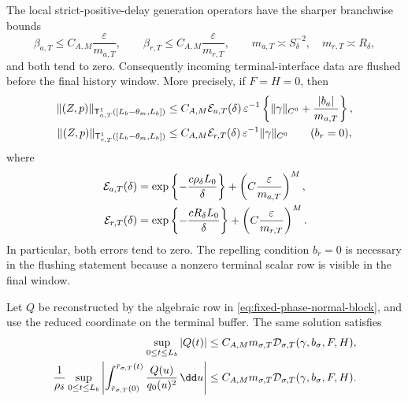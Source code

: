 \begin{proposition}
The local strict-positive-delay generation operators have the sharper
branchwise bounds
\begin{equation}
 \beta_{a,T}\le C_{A,M}\frac{\varepsilon}{m_{a,T}},
 \qquad
 \beta_{r,T}\le C_{A,M}\frac{\varepsilon}{m_{r,T}},
 \qquad
 m_{a,T}\asymp S_\delta^{-2},\quad
 m_{r,T}\asymp R_\delta,                         \label{eq:terminal-component-generation-numbers}
\end{equation}
and both tend to zero.  Consequently incoming terminal-interface data are
flushed before the final history window.  More precisely, if \(F=H=0\), then
\begin{align}
 \|(Z,p)\|_{\mathsf T_{a,T}^1([L_b-\theta_m,L_b])}
 &\le C_{A,M}\mathcal E_{a,T}(\delta)\,
   \varepsilon^{-1}\left\{
      \|\gamma\|_{C^0}+\frac{|b_a|}{m_{a,T}}\right\},\notag\\
 \|(Z,p)\|_{\mathsf T_{r,T}^1([L_b-\theta_m,L_b])}
 &\le C_{A,M}\mathcal E_{r,T}(\delta)\,
        \varepsilon^{-1}\|\gamma\|_{C^0}
        \qquad (b_r=0),                          \label{eq:terminal-component-rough-flush}
\end{align}
where
\begin{align}
 \mathcal E_{a,T}(\delta)
 &=\exp\left\{-\frac{c\rho_\delta L_0}{\delta}\right\}
       +\left(C\frac{\varepsilon}{m_{a,T}}\right)^M,\notag\\
 \mathcal E_{r,T}(\delta)
 &=\exp\left\{-\frac{cR_\delta L_0}{\delta}\right\}
       +\left(C\frac{\varepsilon}{m_{r,T}}\right)^M.
                                                        \label{eq:terminal-component-flush-errors}
\end{align}
In particular, both errors tend to zero.  The repelling condition \(b_r=0\)
is necessary in the flushing statement because a nonzero terminal scalar
row is visible in the final window.

Let \(Q\) be reconstructed by the algebraic row in
\cref{eq:fixed-phase-normal-block}, and use the reduced coordinate on the
terminal buffer.  The same solution satisfies
\begin{align}
 \sup_{0\le t\le L_b}|Q(t)|
 &\le C_{A,M}m_{\sigma,T}
       \mathcal D_{\sigma,T}(\gamma,b_\sigma,F,H),\notag\\
 \frac1{\rho_\delta}\sup_{0\le t\le L_b}
 \left|\int_{\bar r_{\sigma,T}(0)}^{\bar r_{\sigma,T}(t)}
          \frac{Q(u)}{q_0(u)^2}\,\dd u\right|
 &\le C_{A,M}m_{\sigma,T}
       \mathcal D_{\sigma,T}(\gamma,b_\sigma,F,H).          \label{eq:terminal-component-local-action}
\end{align}


\end{proposition}
